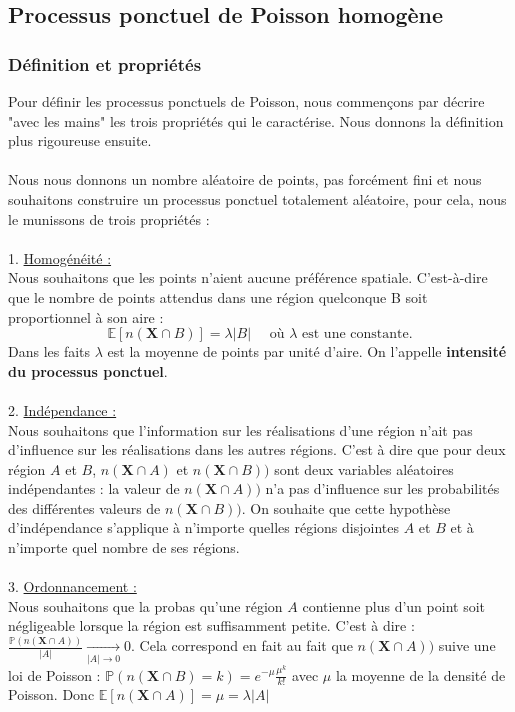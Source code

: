 \documentclass[12pt]{article}
\begin{document}
\subsection{Processus ponctuel de Poisson homogène}
\subsubsection*{Définition et propriétés}
Pour définir les processus ponctuels de Poisson, nous commençons par décrire "avec les mains" les trois propriétés qui le caractérise. Nous donnons la définition plus rigoureuse ensuite.\\
\\
Nous nous donnons un nombre aléatoire de points, pas forcément fini et nous souhaitons construire un processus ponctuel totalement aléatoire, pour cela, nous le munissons de trois propriétés :\\
\\
1. \underline{Homogénéité :}\\
Nous souhaitons que les points n'aient aucune préférence spatiale. C'est-à-dire que le nombre de points attendus dans une région quelconque B soit proportionnel à son aire : 
\[
\mathbb{E}[n(\textbf{X}\cap B)] = \lambda|B| \quad \text{ où } \lambda \text{ est une constante.} 
\]
\newline
Dans les faits $\lambda$ est la moyenne de points par unité d'aire. On l'appelle \textbf{intensité du processus ponctuel}.\\
\\
2. \underline{Indépendance :}\\
Nous souhaitons que l'information sur les réalisations d'une région n'ait pas d'influence sur les réalisations dans les autres régions. C'est à dire que pour deux région $A$ et $B$, $n(\textbf{X}\cap A)$ et $n(\textbf{X}\cap B))$ sont deux variables aléatoires indépendantes : la valeur de $n(\textbf{X}\cap A))$ n'a pas d’influence sur les probabilités des différentes valeurs de $n(\textbf{X}\cap B))$. On souhaite que cette hypothèse d'indépendance s'applique à n'importe quelles régions disjointes $A$ et $B$ et à n'importe quel nombre de ses régions.\\
\\
3. \underline{Ordonnancement :}\\
Nous souhaitons que la probas qu'une région $A$ contienne plus d'un point soit négligeable lorsque la région est suffisamment petite. C'est à dire :
$\frac{\mathbb{P}(n(\textbf{X}\cap A))}{|A|} \underset{|A|\to 0 }{\longrightarrow} 0$.  Cela correspond en fait au fait que $n(\textbf{X}\cap A))$ suive une loi de Poisson : $\mathbb{P}(n(\textbf{X}\cap B)=k) = e^{-\mu}\frac{\mu^k}{k!}$ avec $\mu$ la moyenne de la densité de Poisson. Donc $\mathbb{E}[n(\textbf{X}\cap A)] = \mu = \lambda|A|$\\
\end{document}

